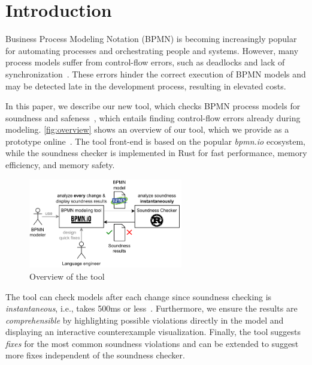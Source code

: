 \documentclass[runningheads]{llncs}
\begin{document}
\section{Introduction} \label{sec:introduction}


Business Process Modeling Notation (BPMN) is becoming increasingly popular for automating processes and orchestrating people and systems.
However, many process models suffer from control-flow errors, such as deadlocks and lack of synchronization~\cite{fahlandAnalysisDemandInstantaneous2011}.
These errors hinder the correct execution of BPMN models and may be detected late in the development process, resulting in elevated costs.

In this paper, we describe our new tool, which checks BPMN process models for soundness and safeness~\cite{corradiniClassificationBPMNCollaborations2018}, which entails finding control-flow errors already during modeling.
\autoref{fig:overview} shows an overview of our tool, which we provide as a prototype online~\cite{noauthorgivenBPM2024Artifacts2024}.
The tool front-end is based on the popular \textit{bpmn.io} ecosystem, while the soundness checker is implemented in Rust for fast performance, memory efficiency, and memory safety.

\begin{figure}[ht]
	\centering
	\includegraphics[width=0.6\textwidth]{images/overview}
	\caption{Overview of the tool}
	\label{fig:overview}
\end{figure}

The tool can check models after each change since soundness checking is \textit{instantaneous}, i.e., takes 500ms or less~\cite{fahlandAnalysisDemandInstantaneous2011}.
Furthermore, we ensure the results are \textit{comprehensible} by highlighting possible violations directly in the model and displaying an interactive counterexample visualization.
Finally, the tool suggests \textit{fixes} for the most common soundness violations and can be extended to suggest more fixes independent of the soundness checker.
\end{document}
